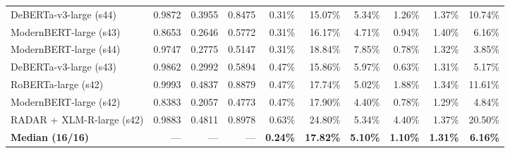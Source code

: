 \begin{table}[t]
\begin{tabular}{@{}lrrrrrrrrr@{}}
DeBERTa-v3-large (s44) & 0.9872 & 0.3955 & 0.8475 & 0.31\% & 15.07\% & 5.34\% & 1.26\% & 1.37\% & 10.74\% \\
ModernBERT-large (s43) & 0.8653 & 0.2646 & 0.5772 & 0.31\% & 16.17\% & 4.71\% & 0.94\% & 1.40\% & 6.16\% \\
ModernBERT-large (s44) & 0.9747 & 0.2775 & 0.5147 & 0.31\% & 18.84\% & 7.85\% & 0.78\% & 1.32\% & 3.85\% \\
DeBERTa-v3-large (s43) & 0.9862 & 0.2992 & 0.5894 & 0.47\% & 15.86\% & 5.97\% & 0.63\% & 1.31\% & 5.17\% \\
RoBERTa-large (s42) & 0.9993 & 0.4837 & 0.8879 & 0.47\% & 17.74\% & 5.02\% & 1.88\% & 1.34\% & 11.61\% \\
ModernBERT-large (s42) & 0.8383 & 0.2057 & 0.4773 & 0.47\% & 17.90\% & 4.40\% & 0.78\% & 1.29\% & 4.84\% \\
RADAR + XLM-R-large (s42) & 0.9883 & 0.4811 & 0.8978 & 0.63\% & 24.80\% & 5.34\% & 4.40\% & 1.37\% & 20.50\% \\
\midrule
\textbf{Median (16/16)} & --- & --- & --- & \textbf{0.24\%} & \textbf{17.82\%} & \textbf{5.10\%} & \textbf{1.10\%} & \textbf{1.31\%} & \textbf{6.16\%} \\
\bottomrule
\end{tabular}
\end{table}
